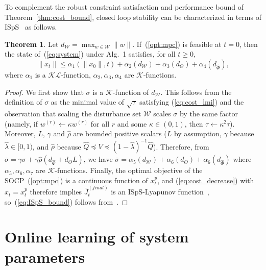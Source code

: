 \documentclass{IEEEtran}
\theoremstyle{definition}
\newtheorem{theorem}{Theorem}
\theoremstyle{remark}
\begin{document}
To complement the robust constraint satisfaction and performance bound of Theorem~\ref{thm:cost_bound}, closed loop stability can be characterized in terms of ISpS~\cite[Def.~6]{limon09} as follows.

\begin{theorem}\label{thm:ISpS_bound}
Let $d_{\mathcal{W}} = \max_{w\in\mathcal{W}} \|w\|$. If~(\ref{opt:mpc}) is feasible at $t=0$, then the state of~(\ref{eq:system}) under Alg.~1 satisfies, for all $t\geq 0$,
\begin{equation}\label{eq:ISpS_bound}
  \|x_t\| \leq \alpha_1(\|x_0\|, t) + \alpha_2(d_{\mathcal{W}}) + \alpha_3(d_\Theta) + \alpha_4(d_{\hat{\Phi}}),
\end{equation}
where $\alpha_1$ is a $\mathcal{K}\mathcal{L}$-function, $\alpha_2,\alpha_3,\alpha_4$ are $\mathcal{K}$-functions.
\end{theorem}

\begin{proof}
We first show that $\sigma$ is a $\mathcal{K}$-function of $d_{\mathcal{W}}$.
%
This follows from the definition of $\sigma$ as the minimal value of $\sqrt{\tau}$ satisfying (\ref{eq:cost_lmi}) and the observation that scaling the disturbance set $\mathcal{W}$ scales $\sigma$ by the same factor (namely, if $w^{(r)}\gets \kappa w^{(r)}$ for all $r$ and some $\kappa\in (0,1)$, then $\tau\gets \kappa^2 \tau$).
%
Moreover, $L$, $\gamma$ and $\hat{\rho}$ are bounded positive scalars ($L$ by assumption, $\gamma$ because $\hat{\lambda}\in[0,1)$, and $\hat{\rho}$ because $\hat{Q} \preceq V \preceq (1-\hat{\lambda})^{-1} \hat{Q}$).
%
Therefore, from $\bar{\sigma} = \gamma \sigma + \gamma \hat{\rho} (d_{\hat{\Phi}} + d_\Theta L)$, we have $\bar{\sigma} = \alpha_5(d_{\mathcal{W}}) + \alpha_6(d_\Theta) + \alpha_6(d_{\hat{\Phi}})$ where $\alpha_5,\alpha_6,\alpha_7$ are $\mathcal{K}$-functions.
%
Finally, the optimal objective of the SOCP~(\ref{opt:mpc}) is a continuous function of $x_t^p$, 
%
and (\ref{eq:cost_decrease}) with $x_t = x_t^p$ therefore implies $\bar{J}^{(\mathit{final})\!}_{t}$ is an ISpS-Lyapunov function~\cite[Def.~7]{limon09},
so~(\ref{eq:ISpS_bound}) follows from~\cite[Thm.~3]{limon09}.
\end{proof}

\section{Online learning of system parameters}\label{sec:param_est}
\end{document}
